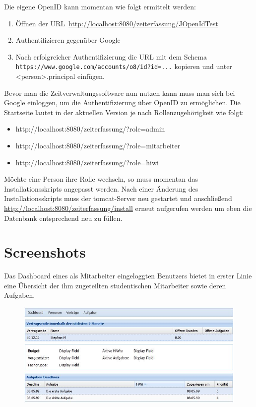 \documentclass[article,colorback,accentcolor=tud2c]{tudreport}
\begin{document}
Die eigene OpenID kann momentan wie folgt ermittelt werden:

\begin{enumerate}
    \item Öffnen der URL~\url{http://localhost:8080/zeiterfassung/JOpenIdTest}
    \item Authentifizieren gegenüber Google
    \item Nach erfolgreicher Authentifizierung die URL mit dem Schema \texttt{https://www.google.com/accounts/o8/id?id=...} kopieren und unter <person>.principal einfügen.
\end{enumerate}

Bevor man die Zeitverwaltungssoftware nun nutzen kann muss man sich bei Google einloggen, um die Authentifizierung über OpenID zu ermöglichen. Die Startseite lautet in der aktuellen Version je nach Rollenzugehörigkeit wie folgt:
\begin{itemize}
\item http://localhost:8080/zeiterfassung/?role=admin
\item http://localhost:8080/zeiterfassung/?role=mitarbeiter
\item http://localhost:8080/zeiterfassung/?role=hiwi
\end{itemize}

Möchte eine Person ihre Rolle wechseln, so muss momentan das Installationsskripts angepasst werden. Nach einer Änderung des Installationsskripts muss der tomcat-Server neu gestartet und anschließend \url{http://localhost:8080/zeiterfassung/install} erneut aufgerufen werden um eben die Datenbank entsprechend neu zu füllen.


\newpage

\section{Screenshots} %
\label{sec:screenshots}

Das Dashboard eines als Mitarbeiter eingeloggten Benutzers bietet in erster Linie eine Übersicht der ihm zugeteilten studentischen Mitarbeiter sowie deren Aufgaben.

\begin{figure}[h]
    \begin{center}
        \includegraphics[scale=0.8]{img/mitarbeiter-dashboard}
    \end{center}
\end{figure}
\end{document}
